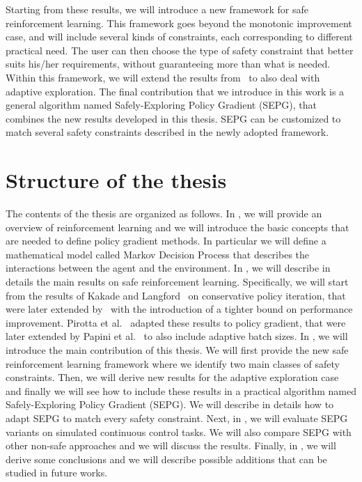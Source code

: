 Starting from these results, we will introduce a new framework for safe reinforcement learning. This framework goes beyond the monotonic improvement case, and will include several kinds of constraints, each corresponding to different practical need. The user can then choose the type of safety constraint that better suits his/her requirements, without guaranteeing more than what is needed. Within this framework, we will extend the results from~\cite{adaptive_step} to also deal with adaptive exploration. The final contribution that we introduce in this work is a general algorithm named Safely-Exploring Policy Gradient (SEPG), that combines the new results developed in this thesis. SEPG can be customized to match several safety constraints described in the newly adopted framework. 

\section{Structure of the thesis}

The contents of the thesis are organized as follows. In , we will provide an overview of reinforcement learning and we will introduce the basic concepts that are needed to define policy gradient methods. In particular we will define a mathematical model called Markov Decision Process that describes the interactions between the agent and the environment. In , we will describe in details the main results on safe reinforcement learning. Specifically, we will start from the results of Kakade and Langford~\cite{Kakade02approximatelyoptimal} on conservative policy iteration, that were later extended by~\cite{safe_iteration} with the introduction of a tighter bound on performance improvement. Pirotta et al.~\cite{adaptive_step} adapted these results to policy gradient, that were later extended by Papini et al.~\cite{adaptive_batch} to also include adaptive batch sizes. In , we will introduce the main contribution of this thesis. We will first provide the new safe reinforcement learning framework where we identify two main classes of safety  constraints. Then, we will derive new results for the adaptive exploration case and finally we will see how to include these results in a practical algorithm named Safely-Exploring Policy Gradient (SEPG). We will describe in details how to adapt SEPG to match every safety constraint. Next, in , we will evaluate SEPG variants on simulated continuous control tasks. We will also compare SEPG with other non-safe approaches and we will discuss the results. Finally, in , we will derive some conclusions and we will describe possible additions that can be studied in future works.
 



